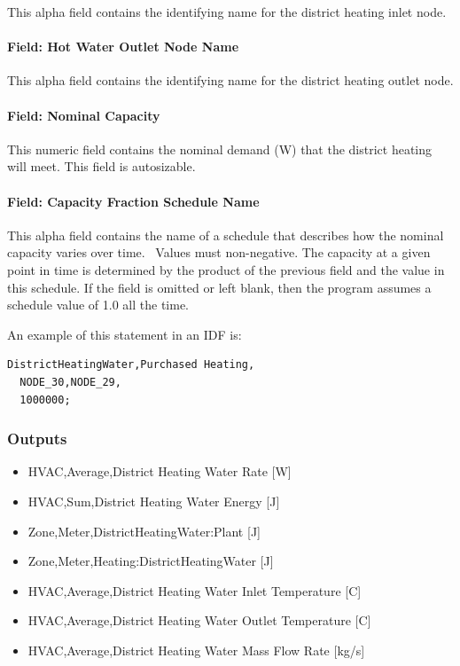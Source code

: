 This alpha field contains the identifying name for the district heating inlet node.

\paragraph{Field: Hot Water Outlet Node Name}\label{field-hot-water-outlet-node-name-2}

This alpha field contains the identifying name for the district heating outlet node.

\paragraph{Field: Nominal Capacity}\label{field-nominal-capacity-11}

This numeric field contains the nominal demand (W) that the district heating will meet. This field is autosizable.

\paragraph{Field: Capacity Fraction Schedule Name}\label{field-capacity-fraction-schedule-name-1}

This alpha field contains the name of a schedule that describes how the nominal capacity varies over time.~ Values must non-negative. The capacity at a given point in time is determined by the product of the previous field and the value in this schedule. If the field is omitted or left blank, then the program assumes a schedule value of 1.0 all the time.

An example of this statement in an IDF is:

\begin{lstlisting}
DistrictHeatingWater,Purchased Heating,
  NODE_30,NODE_29,
  1000000;
\end{lstlisting}

\subsubsection{Outputs}\label{outputs-15-002}

\begin{itemize}
    \item
    HVAC,Average,District Heating Water Rate {[}W{]}
    \item
    HVAC,Sum,District Heating Water Energy {[}J{]}
    \item
    Zone,Meter,DistrictHeatingWater:Plant {[}J{]}
    \item
    Zone,Meter,Heating:DistrictHeatingWater {[}J{]}
    \item
    HVAC,Average,District Heating Water Inlet Temperature {[}C{]}
    \item
    HVAC,Average,District Heating Water Outlet Temperature {[}C{]}
    \item
    HVAC,Average,District Heating Water Mass Flow Rate {[}kg/s{]}
\end{itemize}

